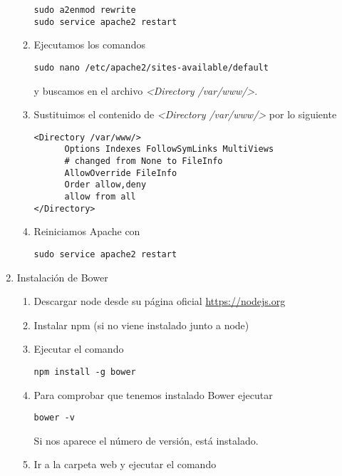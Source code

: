 \begin{enumerate}
\begin{enumerate}
\begin{verbatim}
sudo a2enmod rewrite
sudo service apache2 restart
\end{verbatim}


\item Ejecutamos los comandos

\begin{verbatim}
sudo nano /etc/apache2/sites-available/default
\end{verbatim}

y buscamos en el archivo \emph{<Directory /var/www/>}.

\item Sustituimos el contenido de \emph{<Directory /var/www/>} por lo siguiente

\begin{verbatim}
<Directory /var/www/>
      Options Indexes FollowSymLinks MultiViews
      # changed from None to FileInfo
      AllowOverride FileInfo
      Order allow,deny
      allow from all
</Directory>
\end{verbatim}

\item Reiniciamos Apache con

\begin{verbatim}
sudo service apache2 restart
\end{verbatim}

\end{enumerate}

\item Instalación de Bower

\begin{enumerate}
\item Descargar node desde su página oficial \url{https://nodejs.org}
\item Instalar npm (si no viene instalado junto a node)
\item Ejecutar el comando 

\begin{verbatim}
npm install -g bower
\end{verbatim}

\item Para comprobar que tenemos instalado Bower ejecutar 

\begin{verbatim}
bower -v
\end{verbatim} 

Si nos aparece el número de versión, está instalado.

\item Ir a la carpeta web y ejecutar el comando 


\end{enumerate}
\end{enumerate}
